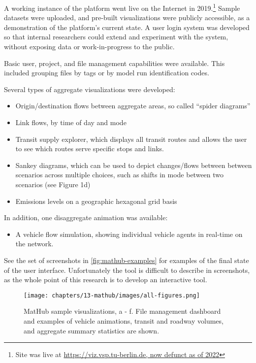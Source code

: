 A working instance of the platform went live on the Internet in 2019.\footnote{Site was live at \url{https://viz.vsp.tu-berlin.de, now defunct as of 2022}} Sample datasets were uploaded, and pre-built visualizations were publicly accessible, as a demonstration of the platform's current state. A user login system was developed so that internal researchers could extend and experiment with the system, without exposing data or work-in-progress to the public.

Basic user, project, and file management capabilities were available. This included grouping files by tags or by model run identification codes.

Several types of aggregate visualizations were developed:

\begin{itemize}
\tightlist
\item
  Origin/destination flows between aggregate areas, so called ``spider
  diagrams''
\item
  Link flows, by time of day and mode
\item
  Transit supply explorer, which displays all transit routes and allows
  the user to see which routes serve specific stops and links.
\item
  Sankey diagrams, which can be used to depict changes/flows between
  between scenarios across multiple choices, such as shifts in mode
  between two scenarios (see Figure 1d)
\item
  Emissions levels on a geographic hexagonal grid basis
\end{itemize}

In addition, one disaggregate animation was available:

\begin{itemize}
\tightlist
\item
  A vehicle flow simulation, showing individual vehicle agents in
  real-time on the network.
\end{itemize}

See the set of screenshots in \autoref{fig:mathub-examples} for examples of the final state of the user interface. Unfortunately the tool is difficult to describe in screenshots, as the whole point of this research is to develop an interactive tool.

\begin{figure}
  \centering
	\begin{minipage}{1.0\textwidth}
  \texttt{[image: chapters/13-mathub/images/all-figures.png]}
  \caption{MatHub sample visualizations, a - f. File management dashboard and examples of vehicle animations, transit and roadway volumes, and aggregate summary statistics are shown.}
  \label{fig:mathub-examples}
	\end{minipage}
\end{figure}

